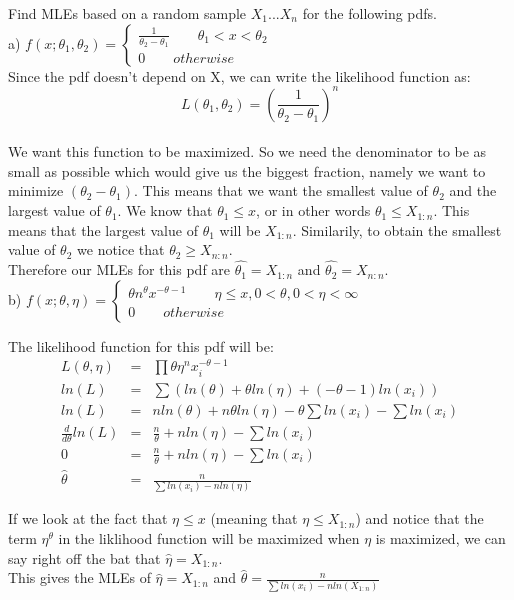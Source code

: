  Find MLEs based on a random sample $X_{1}...X_{n}$ for the following pdfs. \\
\noindent a) $f(x; \theta_{1},\theta_{2} )=\begin{cases} \frac{1}{\theta_{2}-\theta_{1}} \qquad \theta_{1}<x<\theta_{2} 
\\0\qquad otherwise \end{cases}$
\\Since the pdf doesn't depend on X, we can write the likelihood function as:
\begin{equation}L(\theta_1, \theta_2)=\left( \frac{1}{\theta_2 - \theta_1}\right)^n \nonumber \end{equation}
\\We want this function to be maximized. So we need the denominator to be as small as possible which would give us the biggest fraction, namely we want to minimize $(\theta_2 -\theta_1)$. This means that we want the smallest value of $\theta_2$ and the largest value of $\theta_1$. We know that $\theta_1 \le x$, or in other words $\theta_1 \le X_{1:n}$. This means that the largest value of $\theta_1$ will be $X_{1:n}$. Similarily, to obtain the smallest value of $\theta_2$ we notice that $\theta_2 \ge X_{n:n}$.
\\Therefore our MLEs for this pdf are $\hat{\theta_1}=X_{1:n}$ and $\hat{\theta_2}=X_{n:n}$.\\

 b) $f(x;\theta, \eta )=\begin{cases} \theta n^{\theta}x^{-\theta-1}\qquad \eta \le x, 0<\theta, 0<\eta<\infty \\ 0\qquad otherwise \end{cases}$

The likelihood function for this pdf will be:
\begin{eqnarray*} L(\theta,\eta) &=& \prod \theta \eta^n x_i^{-\theta-1}\\
ln(L) &=& \sum(ln(\theta)+\theta ln(\eta)+(-\theta-1)ln(x_i))\\
ln(L) &=& nln(\theta)+n\theta ln(\eta)-\theta\sum ln(x_i)-\sum ln(x_i)\\
\frac{d}{d\theta}ln(L) &=& \frac{n}{\theta}+n ln(\eta)-\sum ln(x_i)\\
0 &=& \frac{n}{\theta}+n ln(\eta)-\sum ln(x_i)\\
\hat{\theta} &=& \frac{n}{\sum ln(x_i) - n ln(\eta)}
\end{eqnarray*}

\noindent If we look at the fact that $\eta \le x$ (meaning that $\eta \le X_{1:n}$) and notice that the term $\eta^\theta$ in the liklihood function will be maximized when $\eta$ is maximized, we can say right off the bat that $\hat{\eta}=X_{1:n}$.
\\This gives the MLEs of $\hat{\eta}=X_{1:n}$ and $\hat{\theta}=\frac{n}{\sum ln(x_i) - n ln(X_{1:n})}$
